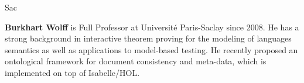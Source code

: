 \begin{sitedescription}{Sac}
\begin{compactitem}
\item {\bf Burkhart Wolff} is Full Professor at Université
  Paris-Saclay since 2008. He has a strong background in interactive
  theorem proving for the modeling of languages semantics as well as
  applications to model-based testing. He recently proposed an
  ontological framework for document consistency and meta-data, which is
  implemented on top of Isabelle/HOL.

\end{compactitem}

\end{sitedescription}


